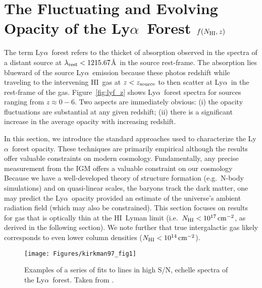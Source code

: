 \documentclass[graybox]{svmult}
\newcommand{\HI}{H{\sc I}}
\def\lya{Ly$\alpha$}
\newcommand{\mnhi}{N_{\rm HI}}
\def\cm#1{\, {\rm cm^{#1}}}
\begin{document}
\clearpage

\section{The Fluctuating and Evolving Opacity of the
\lya\ Forest $f(\mnhi,z)$}

The term \lya\ forest refers to the thicket of absorption
observed in the spectra of a distant source at 
$\lambda_{\rm rest} < 1215.67$\AA\ in the source rest-frame.
The absorption lies blueward of the source \lya\ emission
because these photos redshift while traveling to the
intervening \HI\ gas at $z < z_{\rm source}$ to then
scatter at \lya\ in the rest-frame of the gas.
Figure~\ref{fig:lyf_z} shows \lya\ forest spectra for
sources ranging from $z \approx 0-6$.  Two aspects are
immediately obvious: 
(i) the opacity fluctuations are substantial at any given
redshift;
(ii) there is a significant increase in the average opacity
with increasing redshift.  

In this section, we introduce
the standard approaches used to characterize the \lya\ 
forest opacity.  These techniques are primarily empirical
although the results offer valuable constraints on modern
cosmology.
Fundamentally, any precise measurement from the IGM offers a 
 valuable constraint on our cosmology
Because we have a well-developed theory of structure formation (e.g.\ N-body
simulations) and
on quasi-linear scales, the baryons track the dark matter,
one may predict the \lya\ opacity provided an estimate
of the universe's ambient
radiation field (which may also be constrained).
This section focuses on results for gas that is
optically thin at the \HI\ Lyman limit (i.e.\ $\mnhi<10^{17} \cm{-2}$,
as derived in the following section).  We note further
that true intergalactic gas 
likely corresponds to even lower column densities
($\mnhi <10^{14} \cm{-2}$).

%
\begin{figure}[b]
\sidecaption
\texttt{[image: Figures/kirkman97\_fig1]}
%
%
\caption{Examples of a series of fits to lines in
high S/N, echelle spectra of the \lya\ forest.
Taken from \cite{kt97}.
}
\label{fig:kirkman97_fig1}       %
\end{figure}
        
\end{document}
